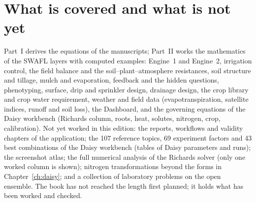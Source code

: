 \section{What is covered and what is not yet}
Part~I derives the equations of the manuscripts; Part~II works the mathematics of the SWAFL layers with computed examples: Engine~1 and Engine~2, irrigation control, the field balance and the soil--plant--atmosphere resistances, soil structure and tillage, mulch and evaporation, feedback and the hidden questions, phenotyping, surface, drip and sprinkler design, drainage design, the crop library and crop water requirement, weather and field data (evapotranspiration, satellite indices, runoff and soil loss), the Dashboard, and the governing equations of the Daisy workbench (Richards column, roots, heat, solutes, nitrogen, crop, calibration). Not yet worked in this edition: the reports, workflows and validity chapters of the application; the 107 reference topics, 69 experiment factors and 43 best combinations of the Daisy workbench (tables of Daisy parameters and runs); the screenshot atlas; the full numerical analysis of the Richards solver (only one worked column is shown); nitrogen transformations beyond the forms in Chapter~\ref{ch:daisy}; and a collection of laboratory problems on the open ensemble. The book has not reached the length first planned; it holds what has been worked and checked.
